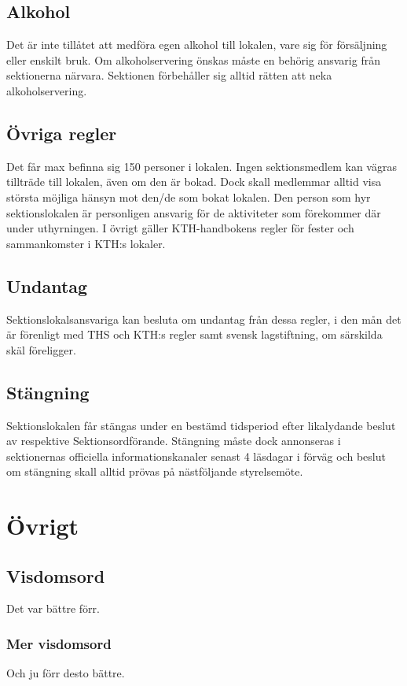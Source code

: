 \documentclass{dgovdoc}
\begin{document}
\subsection{Alkohol}

Det är inte tillåtet att medföra egen alkohol till lokalen, vare sig för
försäljning eller enskilt bruk. Om alkoholservering önskas måste en behörig
ansvarig från sektionerna närvara. Sektionen förbehåller sig alltid rätten att
neka alkoholservering.

\subsection{Övriga regler}

Det får max befinna sig 150 personer i lokalen. Ingen sektionsmedlem kan vägras
tillträde till lokalen, även om den är bokad. Dock skall medlemmar alltid visa
största möjliga hänsyn mot den/de som bokat lokalen. Den person som hyr
sektionslokalen är personligen ansvarig för de aktiviteter som förekommer där
under uthyrningen. I övrigt gäller KTH-handbokens regler för fester och
sammankomster i KTH:s lokaler.

\subsection{Undantag}

Sektionslokalsansvariga kan besluta om undantag från dessa regler, i den mån
det är förenligt med THS och KTH:s regler samt svensk lagstiftning, om
särskilda skäl föreligger.

\subsection{Stängning}
\label{sec:sektionslokal-stangning}

Sektionslokalen får stängas under en bestämd tidsperiod efter likalydande
beslut av respektive Sektionsordförande. Stängning måste dock annonseras i
sektionernas officiella informationskanaler senast 4 läsdagar i förväg och
beslut om stängning skall alltid prövas på nästföljande styrelsemöte.

\section{Övrigt}

\subsection{Visdomsord}

Det var bättre förr.

\subsubsection{Mer visdomsord}

Och ju förr desto bättre.
\end{document}
